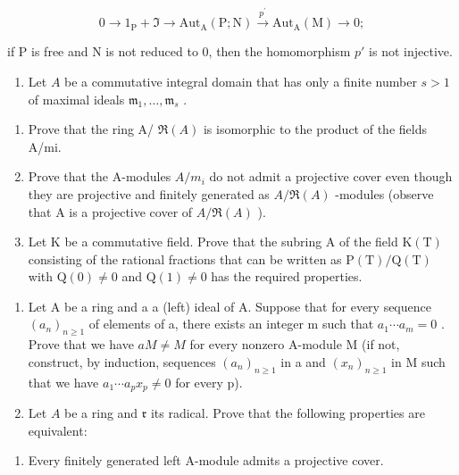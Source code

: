 \[
0 \to 1 _ {\mathrm{P}} + \Im \to \mathrm{Aut} _ {\mathrm{A}} (\mathrm{P}; \mathrm{N}) \xrightarrow {p ^ {\prime}} \mathrm{Aut} _ {\mathrm{A}} (\mathrm{M}) \to 0;
\]

if P is free and N is not reduced to 0, then the homomorphism \(p'\) is not injective.

\begin{enumerate}
\def\labelenumi{\arabic{enumi})}
\setcounter{enumi}{21}
\tightlist
\item
  Let \(A\) be a commutative integral domain that has only a finite number \(s > 1\) of maximal ideals \(\mathfrak{m}_1, \ldots, \mathfrak{m}_s\) .
\end{enumerate}

\begin{enumerate}
\def\labelenumi{\alph{enumi})}
\item
  Prove that the ring A/ \(\Re(A)\) is isomorphic to the product of the fields A/mi.
\item
  Prove that the A-modules \(A/m_{i}\) do not admit a projective cover even though they are projective and finitely generated as \(A/\Re(A)\) -modules (observe that A is a projective cover of \(A/\Re(A)\) ).
\item
  Let K be a commutative field. Prove that the subring A of the field \(\mathrm{K(T)}\) consisting of the rational fractions that can be written as \(\mathrm{P(T)/Q(T)}\) with \(\mathrm{Q(0) \neq 0}\) and \(\mathrm{Q(1) \neq 0}\) has the required properties.
\end{enumerate}

\begin{enumerate}
\def\labelenumi{\arabic{enumi})}
\setcounter{enumi}{22}
\item
  Let A be a ring and a a (left) ideal of A. Suppose that for every sequence \((a_{n})_{n\geqslant1}\) of elements of a, there exists an integer m such that \(a_{1}\cdots a_{m}=0\) . Prove that we have \(aM\neq M\) for every nonzero A-module M (if not, construct, by induction, sequences \((a_{n})_{n\geqslant1}\) in a and \((x_{n})_{n\geqslant1}\) in M such that we have \(a_{1}\cdots a_{p}x_{p}\neq0\) for every p).
\item
  Let \(A\) be a ring and \(\mathfrak{r}\) its radical. Prove that the following properties are equivalent:
\end{enumerate}

\begin{enumerate}
\def\labelenumi{(\roman{enumi})}
\tightlist
\item
  Every finitely generated left A-module admits a projective cover.
\end{enumerate}

